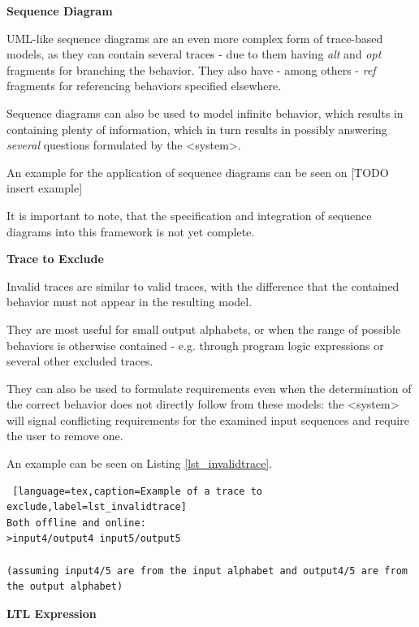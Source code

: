 \textbf{Sequence Diagram}

UML-like sequence diagrams are an even more complex form of trace-based models, as they can contain several traces - due to them having \textit{alt} and \textit{opt} fragments for branching the behavior. They also have - among others - \textit{ref} fragments for referencing behaviors specified elsewhere.

Sequence diagrams can also be used to model infinite behavior, which results in containing plenty of information, which in turn results in possibly answering \textit{several} questions formulated by the <system>.

An example for the application of sequence diagrams can be seen on [TODO insert example]

It is important to note, that the specification and integration of sequence diagrams into this framework is not yet complete. 

\textbf{Trace to Exclude}

Invalid traces are similar to valid traces, with the difference that the contained behavior must not appear in the resulting model. 

They are most useful for small output alphabets, or when the range of possible behaviors is otherwise contained - e.g. through program logic expressions or several other excluded traces.

They can also be used to formulate requirements even when the determination of the correct behavior does not directly follow from these models: the <system> will signal conflicting requirements for the examined input sequences and require the user to remove one.

An example can be seen on Listing \ref{lst_invalidtrace}.

\bigskip
\begin{lstlisting} [language=tex,caption=Example of a trace to exclude,label=lst_invalidtrace]
Both offline and online:
>input4/output4 input5/output5

(assuming input4/5 are from the input alphabet and output4/5 are from the output alphabet) 
\end{lstlisting}

\textbf{LTL Expression}

